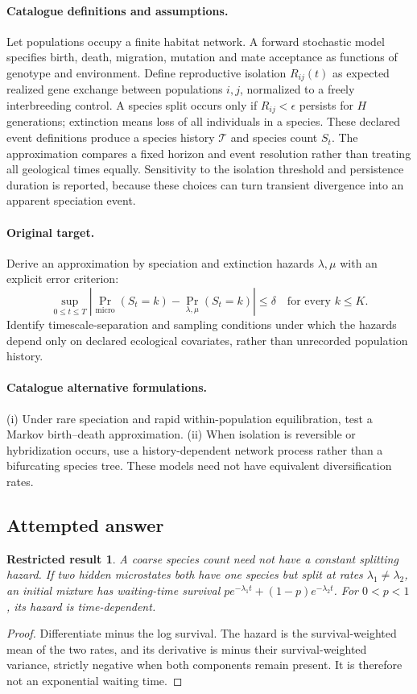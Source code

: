 \documentclass[11pt]{article}
\newtheorem{attemptresult}{Restricted result}[section]
\begin{document}
\paragraph{Catalogue definitions and assumptions.}
Let populations occupy a finite habitat network. A forward stochastic model specifies birth, death, migration, mutation and mate acceptance as functions of genotype and environment. Define reproductive isolation $R_{ij}(t)$ as expected realized gene exchange between populations $i,j$, normalized to a freely interbreeding control. A species split occurs only if $R_{ij}<\epsilon$ persists for $H$ generations; extinction means loss of all individuals in a species. These declared event definitions produce a species history $\mathcal T$ and species count $S_t$. The approximation compares a fixed horizon and event resolution rather than treating all geological times equally. Sensitivity to the isolation threshold and persistence duration is reported, because these choices can turn transient divergence into an apparent speciation event.
\paragraph{Original target.}
Derive an approximation by speciation and extinction hazards $\lambda,\mu$ with an explicit error criterion:
\[
 \sup_{0\le t\le T}
 \left|\Pr_{\mathrm{micro}}(S_t=k)-\Pr_{\lambda,\mu}(S_t=k)\right|
 \le\delta\quad\text{for every }k\le K.
\]
Identify timescale-separation and sampling conditions under which the hazards depend only on declared ecological covariates, rather than unrecorded population history.
\paragraph{Catalogue alternative formulations.}
(i) Under rare speciation and rapid within-population equilibration, test a Markov birth--death approximation. (ii) When isolation is reversible or hybridization occurs, use a history-dependent network process rather than a bifurcating species tree. These models need not have equivalent diversification rates.
\subsection{Attempted answer}
\begin{attemptresult}
A coarse species count need not have a constant splitting hazard. If two hidden microstates both have one species but split at rates $\lambda_1\ne\lambda_2$, an initial mixture has waiting-time survival $pe^{-\lambda_1t}+(1-p)e^{-\lambda_2t}$. For $0<p<1$, its hazard is time-dependent.
\end{attemptresult}
\begin{proof}
Differentiate minus the log survival. The hazard is the survival-weighted mean of the two rates, and its derivative is minus their survival-weighted variance, strictly negative when both components remain present. It is therefore not an exponential waiting time.
\end{proof}
\end{document}
